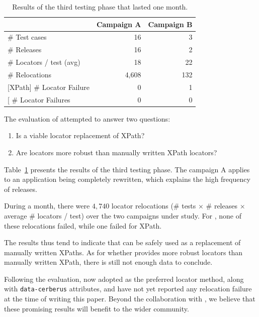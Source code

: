 \begin{table}[]
\centering
\begin{tabular}{l|r|r|}
\cline{2-3}
                                                       & \bf Campaign A & \bf Campaign B \\ \hline
\multicolumn{1}{|l|}{\# Test cases}                        & 16         & 3          \\ \hline
\multicolumn{1}{|l|}{\# Releases}                          & 16         & 2          \\ \hline
\multicolumn{1}{|l|}{\# Locators / test (avg)}             & 18         & 22          \\ \hline
\multicolumn{1}{|l|}{\# Relocations}                       & 4,608       & 132         \\ \hline
\multicolumn{1}{|l|}{{[}XPath{]} \# Locator Failure} & 0          & 1          \\ \hline
\multicolumn{1}{|l|}{{[}\erratum{}{]} \# Locator Failures} & 0          & 0          \\ \hline
\end{tabular}
\caption{Results of the third testing phase that lasted one month.}
\label{table:results}
\end{table}

The evaluation of \erratum attempted to answer two questions:
\begin{enumerate}
\item Is \erratum a viable locator replacement of XPath?
\item Are \erratum locators more robust than manually written XPath locators?
\end{enumerate}

Table~\ref{table:results} presents the results of the third testing phase.
The campaign A applies to an application being completely rewritten, which explains the high frequency of releases.

During a month, there were $4,740$ locator relocations (\# tests $\times$ \# releases $\times$ average \# locators / test) over the two campaigns under study.
For \erratum, none of these relocations failed, while one failed for XPath.

The results thus tend to indicate that \erratum can be safely used as a replacement of manually written {\sc XPaths}.
As for whether \erratum provides more robust locators than manually written XPath, there is still not enough data to conclude. 

Following the evaluation, \laredoute{} now adopted \erratum as the preferred locator method, along with \texttt{data-cerberus} attributes, and have not yet reported any relocation failure at the time of writing this paper.
Beyond the collaboration with \laredoute, we believe that these promising results will benefit to the wider \cerberus community.

